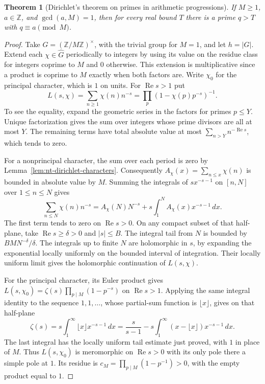 \documentclass[11pt,oneside,openany]{book}
\theoremstyle{plain}
\newtheorem{theorem}{Theorem}[chapter]
\theoremstyle{definition}
\theoremstyle{remark}
\begin{document}
\begin{theorem}[Dirichlet's theorem on primes in arithmetic progressions]
\label{nt:dirichlet-primes}
If \(M\ge1\), \(a\in\mathbb Z\), and \(\gcd(a,M)=1\), then for every
real bound \(T\) there is a prime \(q>T\) with \(q\equiv a\pmod M\).
\end{theorem}
\begin{proof}
Take \(G=(\mathbb Z/M\mathbb Z)^\times\), with the trivial group
for \(M=1\), and let \(h=|G|\). Extend each \(\chi\in\widehat G\)
periodically to integers by using its value on the residue class for
integers coprime to \(M\) and \(0\) otherwise. This extension is
multiplicative since a product is coprime to \(M\) exactly when
both factors are. Write \(\chi_0\) for the principal character,
which is \(1\) on units. For \(\operatorname{Re}s>1\) put
\[
 L(s,\chi)=\sum_{n\ge1}\chi(n)n^{-s}
          =\prod_p(1-\chi(p)p^{-s})^{-1}.
\]
To see the equality, expand the geometric series in the factors
for primes \(p\le Y\). Unique factorization gives the sum over
integers whose prime divisors are all at most \(Y\). The remaining
terms have total absolute value at most
\(\sum_{n>Y}n^{-\operatorname{Re}s}\), which tends to zero.

For a nonprincipal character, the sum over each period is zero
by Lemma~\ref{lem:nt-dirichlet-characters}. Consequently
\(A_\chi(x)=\sum_{n\le x}\chi(n)\) is bounded in absolute value
by \(M\). Summing the integrals of \(s x^{-s-1}\) on \([n,N]\)
over \(1\le n\le N\) gives
\[
 \sum_{n\le N}\chi(n)n^{-s}
   =A_\chi(N)N^{-s}+s\int_1^N A_\chi(x)x^{-s-1}\,dx .
\]
The first term tends to zero on \(\operatorname{Re}s>0\).
On any compact subset of that half-plane, take
\(\operatorname{Re}s\ge\delta>0\) and \(|s|\le B\).
The integral tail from \(N\) is bounded by \(BMN^{-\delta}/\delta\).
The integrals up to finite \(N\) are holomorphic in \(s\), by
expanding the exponential locally uniformly on the bounded
interval of integration. Their locally uniform limit gives the
holomorphic continuation of \(L(s,\chi)\).

For the principal character, its Euler product gives
\(L(s,\chi_0)=\zeta(s)\prod_{p\mid M}(1-p^{-s})\) on
\(\operatorname{Re}s>1\). Applying the same integral identity to
the sequence \(1,1,\ldots\), whose partial-sum function is
\(\lfloor x\rfloor\), gives on that half-plane
\[
 \zeta(s)=s\int_1^\infty\lfloor x\rfloor x^{-s-1}\,dx
         =\frac{s}{s-1}
            -s\int_1^\infty (x-\lfloor x\rfloor)x^{-s-1}\,dx.
\]
The last integral has the locally uniform tail estimate just
proved, with \(1\) in place of \(M\). Thus \(L(s,\chi_0)\) is
meromorphic on \(\operatorname{Re}s>0\) with its only pole there
a simple pole at \(1\). Its residue is
\(c_M=\prod_{p\mid M}(1-p^{-1})>0\), with the empty product
equal to \(1\).


\end{proof}
\end{document}
